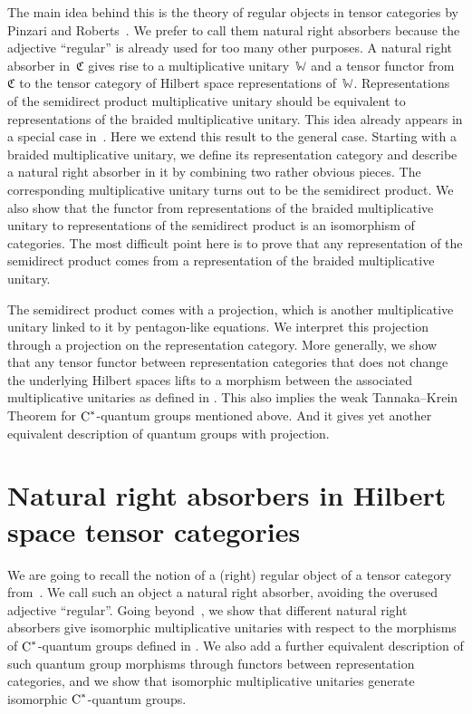 \documentclass[a4paper]{amsart}
\numberwithin{equation}{section}
\theoremstyle{plain}
\numberwithin{theorem}{section}
\theoremstyle{definition}
\theoremstyle{remark}
\newcommand*{\Cat}{\mathfrak C}     %
\newcommand*{\nb}{\nobreakdash}
\newcommand*{\Multunit}[1][]{\mathbb W^{#1}}%
\newcommand*{\Cst}{\textup C^*}%
\begin{document}
The main idea behind this is the theory of regular objects in tensor
categories by Pinzari and Roberts~\cite{Pinzari-Roberts:Regular}.  We
prefer to call them natural right absorbers because the adjective
``regular'' is already used for too many other purposes.  A natural
right absorber in~\(\Cat\) gives rise to a multiplicative
unitary~\(\Multunit\) and a tensor functor from~\(\Cat\) to the
tensor category of Hilbert space representations of~\(\Multunit\).
Representations of the semidirect product multiplicative unitary
should be equivalent to representations of the braided
multiplicative unitary.  This idea already appears in a special case
in~\cite{Kasprzak-Meyer-Roy-Woronowicz:Braided_SU2}.  Here we extend
this result to the general case.  Starting with a braided
multiplicative unitary, we define its representation category and
describe a natural right absorber in it by combining two rather
obvious pieces.  The corresponding multiplicative unitary turns out to
be the semidirect product.
We also show that the functor from representations of the braided
multiplicative unitary to representations of the semidirect
product is an isomorphism of categories.  The most difficult point
here is to prove that any representation of the semidirect product
comes from a representation of the braided multiplicative unitary.

The semidirect product comes with a projection, which is another
multiplicative unitary linked to it by pentagon-like equations.  We
interpret this projection through a projection on the representation
category.  More generally, we show that any tensor functor between
representation categories that does not change the underlying Hilbert
spaces lifts to a morphism between the associated multiplicative
unitaries as defined in \cites{Meyer-Roy-Woronowicz:Homomorphisms,
  Ng:Morph_of_Mult_unit}.  This also implies the weak Tannaka--Krein
Theorem for \(\Cst\)\nb-quantum groups mentioned above.
And it gives yet another equivalent description of quantum groups with
projection.


\section{Natural right absorbers in Hilbert space tensor categories}
\label{sec:absorbers}

We are going to recall the notion of a (right) regular object of a
tensor category from~\cite{Pinzari-Roberts:Regular}.  We call such an
object a natural right absorber, avoiding the overused adjective
``regular''.  Going beyond~\cite{Pinzari-Roberts:Regular}, we show
that different natural
right absorbers give isomorphic multiplicative unitaries with respect
to the morphisms of \(\Cst\)\nb-quantum
groups defined in \cites{Meyer-Roy-Woronowicz:Homomorphisms,
  Ng:Morph_of_Mult_unit}.  We also add a further equivalent
description of such quantum group morphisms through functors between
representation categories, and we show that isomorphic
multiplicative unitaries generate isomorphic \(\Cst\)\nb-quantum
groups.
\end{document}
